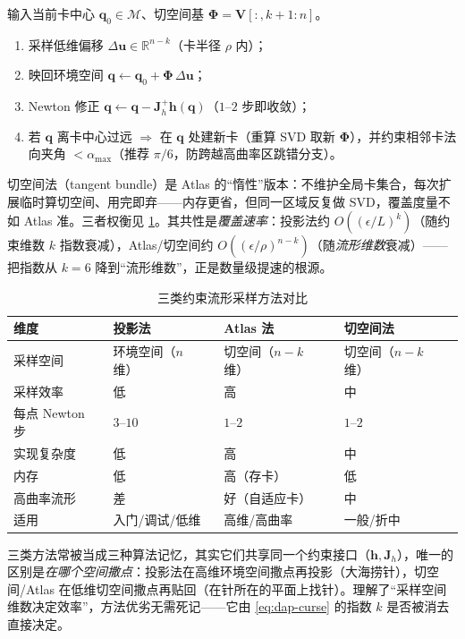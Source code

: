 \begin{algo}\label{alg:dap-atlas}
输入当前卡中心 $\mathbf{q}_0\in\mathcal{M}$、切空间基 $\boldsymbol{\Phi}=\mathbf{V}[:,k{+}1{:}n]$。
\begin{enumerate}
  \item 采样低维偏移 $\Delta\mathbf{u}\in\mathbb{R}^{n-k}$（卡半径 $\rho$ 内）；
  \item 映回环境空间 $\mathbf{q}\leftarrow\mathbf{q}_0+\boldsymbol{\Phi}\,\Delta\mathbf{u}$；
  \item Newton 修正 $\mathbf{q}\leftarrow\mathbf{q}-\mathbf{J}_h^{+}\mathbf{h}(\mathbf{q})$（$1$--$2$ 步即收敛）；
  \item 若 $\mathbf{q}$ 离卡中心过远 $\Rightarrow$ 在 $\mathbf{q}$ 处建新卡（重算 SVD 取新 $\boldsymbol{\Phi}$），并约束相邻卡法向夹角 $<\alpha_{\max}$（推荐 $\pi/6$，防跨越高曲率区跳错分支）。
\end{enumerate}
\end{algo}

切空间法（tangent bundle）是 Atlas 的“惰性”版本：不维护全局卡集合，每次扩展临时算切空间、用完即弃——内存更省，但同一区域反复做 SVD，覆盖度量不如 Atlas 准。三者权衡见 \cref{tab:dap-methods}。其共性是\emph{覆盖速率}：投影法约 $O((\epsilon/L)^{k})$（随约束维数 $k$ 指数衰减），Atlas/切空间约 $O((\epsilon/\rho)^{n-k})$（随\emph{流形维数}衰减）——把指数从 $k=6$ 降到“流形维数”，正是数量级提速的根源。

\begin{table}[H]\centering\small
\caption{三类约束流形采样方法对比}
\label{tab:dap-methods}
\begin{tabular}{llll}
\toprule
维度 & 投影法 & Atlas 法 & 切空间法 \\
\midrule
采样空间 & 环境空间（$n$ 维） & 切空间（$n{-}k$ 维） & 切空间（$n{-}k$ 维） \\
采样效率 & 低 & 高 & 中 \\
每点 Newton 步 & $3$--$10$ & $1$--$2$ & $1$--$2$ \\
实现复杂度 & 低 & 高 & 中 \\
内存 & 低 & 高（存卡） & 低 \\
高曲率流形 & 差 & 好（自适应卡） & 中 \\
适用 & 入门/调试/低维 & 高维/高曲率 & 一般/折中 \\
\bottomrule
\end{tabular}
\end{table}

\begin{insight}
三类方法常被当成三种算法记忆，其实它们共享同一个约束接口（$\mathbf{h},\mathbf{J}_h$），唯一的区别是\emph{在哪个空间撒点}：投影法在高维环境空间撒点再投影（大海捞针），切空间/Atlas 在低维切空间撒点再贴回（在针所在的平面上找针）。理解了“采样空间维数决定效率”，方法优劣无需死记——它由 \cref{eq:dap-curse} 的指数 $k$ 是否被消去直接决定。
\end{insight}

